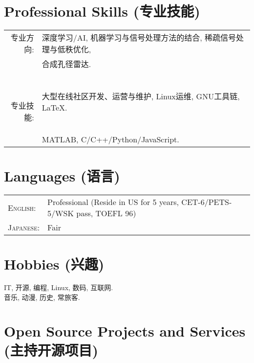 \documentclass[paper=a4,fontsize=11pt]{scrartcl}
\begin{document}
\section*{Professional Skills (专业技能)}

\begin{tabular}{rl}
	
	专业方向: & 深度学习/AI, 机器学习与信号处理方法的结合, 稀疏信号处理与低秩优化,\\
	& 合成孔径雷达.\\
	
	~
	
	专业技能: & 大型在线社区开发、运营与维护, Linux运维, GNU工具链, \LaTeX.\\
	& MATLAB, C/C++/Python/JavaScript.
\end{tabular}

\section*{Languages (语言)}

\begin{tabular}{ll}
	
	\textsc{English:} & Professional (Reside in US for 5 years, CET-6/PETS-5/WSK pass, TOEFL 96) \\
	
	\textsc{Japanese:} & Fair\\
\end{tabular}


\section*{Hobbies (兴趣)}

IT, 开源, 编程, Linux, 数码, 互联网.\\
音乐, 动漫, 历史, 常旅客.\\

\section*{Open Source Projects and Services (主持开源项目)}
\end{document}
